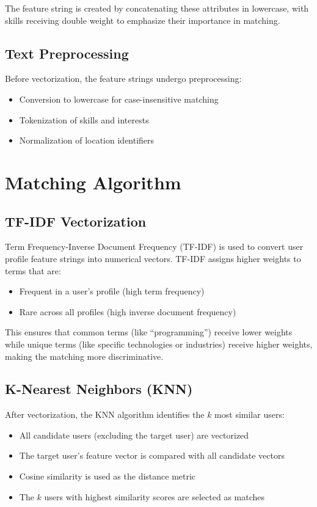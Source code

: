 \documentclass[12pt,a4paper]{report}
\let\origsection\section
\renewcommand{\section}{\needspace{4\baselineskip}\origsection}
\let\origsubsection\subsection
\renewcommand{\subsection}{\needspace{4\baselineskip}\origsubsection}
\begin{document}
The feature string is created by concatenating these attributes in lowercase, with skills receiving double weight to emphasize their importance in matching.

\subsection{Text Preprocessing}

Before vectorization, the feature strings undergo preprocessing:
\begin{itemize}[noitemsep]
    \item Conversion to lowercase for case-insensitive matching
    \item Tokenization of skills and interests
    \item Normalization of location identifiers
\end{itemize}

\section{Matching Algorithm}

\subsection{TF-IDF Vectorization}

Term Frequency-Inverse Document Frequency (TF-IDF) is used to convert user profile feature strings into numerical vectors. TF-IDF assigns higher weights to terms that are:
\begin{itemize}[noitemsep]
    \item Frequent in a user's profile (high term frequency)
    \item Rare across all profiles (high inverse document frequency)
\end{itemize}

This ensures that common terms (like ``programming'') receive lower weights while unique terms (like specific technologies or industries) receive higher weights, making the matching more discriminative.

\subsection{K-Nearest Neighbors (KNN)}

After vectorization, the KNN algorithm identifies the $k$ most similar users:
\begin{itemize}[noitemsep]
    \item All candidate users (excluding the target user) are vectorized
    \item The target user's feature vector is compared with all candidate vectors
    \item Cosine similarity is used as the distance metric
    \item The $k$ users with highest similarity scores are selected as matches
\end{itemize}
\end{document}
